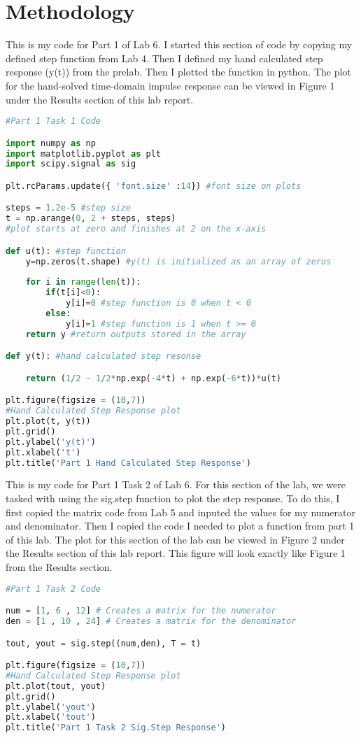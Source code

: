 \documentclass[12pt]{report}
\begin{document}
\section{Methodology}

This is my code for Part 1 of Lab 6. I started this section of code by copying my defined step function from Lab 4. Then I defined my hand calculated step response (y(t)) from the prelab. Then I plotted the function in python. The plot for the hand-solved time-domain impulse response can be viewed in Figure 1 under the Results section of this lab report.  
\begin{lstlisting}[language=Python]
#Part 1 Task 1 Code

import numpy as np
import matplotlib.pyplot as plt
import scipy.signal as sig

plt.rcParams.update({ 'font.size' :14}) #font size on plots

steps = 1.2e-5 #step size
t = np.arange(0, 2 + steps, steps) 
#plot starts at zero and finishes at 2 on the x-axis

def u(t): #step function
    y=np.zeros(t.shape) #y(t) is initialized as an array of zeros
    
    for i in range(len(t)):
        if(t[i]<0):
            y[i]=0 #step function is 0 when t < 0
        else:
            y[i]=1 #step function is 1 when t >= 0
    return y #return outputs stored in the array

def y(t): #hand calculated step resonse

    return (1/2 - 1/2*np.exp(-4*t) + np.exp(-6*t))*u(t)

plt.figure(figsize = (10,7))
#Hand Calculated Step Response plot
plt.plot(t, y(t))
plt.grid()
plt.ylabel('y(t)')
plt.xlabel('t')
plt.title('Part 1 Hand Calculated Step Response')

\end{lstlisting}

{This is my code for Part 1 Task 2 of Lab 6. For this section of the lab, we were tasked with using the sig.step function to plot the step response. To do this, I first copied the matrix code from Lab 5 and inputed the values for my numerator and denominator. Then I copied the code I needed to plot a function from part 1 of this lab. The plot for this section of the lab can be viewed in Figure 2 under the Results section of this lab report. This figure will look exactly like Figure 1 from the Results section.  }
\begin{lstlisting}[language=Python]
#Part 1 Task 2 Code

num = [1, 6 , 12] # Creates a matrix for the numerator
den = [1 , 10 , 24] # Creates a matrix for the denominator

tout, yout = sig.step((num,den), T = t)

plt.figure(figsize = (10,7))
#Hand Calculated Step Response plot
plt.plot(tout, yout)
plt.grid()
plt.ylabel('yout')
plt.xlabel('tout')
plt.title('Part 1 Task 2 Sig.Step Response')
\end{lstlisting}
\end{document}
